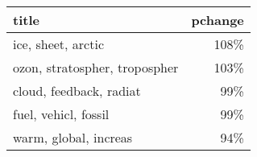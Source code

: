 \begin{tabular}{p{1.2cm}r}
\toprule
                         title &  pchange \\
\midrule
            ice, sheet, arctic &     108\% \\
 ozon, stratospher, tropospher &     103\% \\
       cloud, feedback, radiat &      99\% \\
          fuel, vehicl, fossil &      99\% \\
         warm, global, increas &      94\% \\
\bottomrule
\end{tabular}
